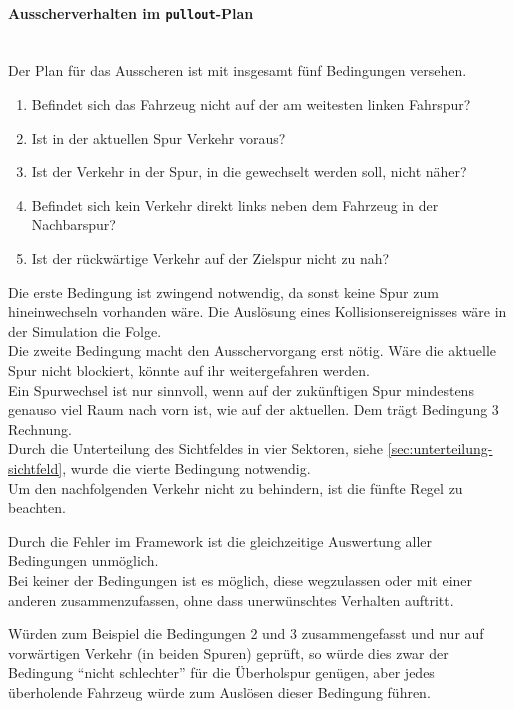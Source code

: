\paragraph*{Ausscherverhalten im \texttt{pullout}-Plan}
\hfill \\
Der Plan für das Ausscheren ist mit insgesamt fünf Bedingungen versehen.

\begin{enumerate}
	\itemsep0em
	\item Befindet sich das Fahrzeug nicht auf der am weitesten linken Fahrspur?
	\item Ist in der aktuellen Spur Verkehr voraus?
	\item Ist der Verkehr in der Spur, in die gewechselt werden soll, nicht näher?
	\item Befindet sich kein Verkehr direkt links neben dem Fahrzeug in der Nachbarspur?
	\item Ist der rückwärtige Verkehr auf der Zielspur nicht zu nah?
\end{enumerate}

Die erste Bedingung ist zwingend notwendig, da sonst keine Spur zum hineinwechseln vorhanden wäre.
Die Auslösung eines Kollisionsereignisses wäre in der Simulation die Folge.
\\
Die zweite Bedingung macht den Ausschervorgang erst nötig. 
Wäre die aktuelle Spur nicht blockiert, könnte auf ihr weitergefahren werden.
\\
Ein Spurwechsel ist nur sinnvoll, wenn auf der zukünftigen Spur mindestens genauso viel Raum nach vorn ist, wie auf der aktuellen. 
Dem trägt Bedingung 3 Rechnung.
\\
Durch die Unterteilung des Sichtfeldes in vier Sektoren, siehe \cref{sec:unterteilung-sichtfeld}, wurde die vierte Bedingung notwendig.
\\
Um den nachfolgenden Verkehr nicht zu behindern, ist die fünfte Regel zu beachten.

Durch die Fehler im Framework ist die gleichzeitige Auswertung aller Bedingungen unmöglich.
\\
Bei keiner der Bedingungen ist es möglich, diese wegzulassen oder mit einer anderen zusammenzufassen, ohne dass unerwünschtes Verhalten auftritt.

Würden zum Beispiel die Bedingungen 2 und 3 zusammengefasst und nur auf vorwärtigen Verkehr (in beiden Spuren) geprüft, so würde dies zwar der Bedingung \enquote{nicht schlechter} für die Überholspur genügen, aber jedes überholende Fahrzeug würde zum Auslösen dieser Bedingung führen.

